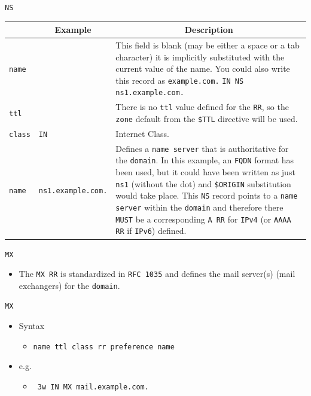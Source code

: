 \documentclass[xcolor=table]{beamer}
\begin{document}
\begin{frame}{\texttt{NS}}
  \begin{table}
    \tiny
    \begin{tabular}{|p{1.6cm}|p{1.6cm}|p{4.7cm}|} 
      \hline
      \rowcolor{gray}
      \multicolumn{1}{|c|}{Syntax} & \multicolumn{1}{c|}{Example} & \multicolumn{1}{c|}{Description}\\ 
      \hline
      \texttt{name}&&This field is blank (may be either a space or a tab character) it is implicitly substituted with the current value of the name. You could also write this record as \texttt{example.com.} \texttt{IN NS ns1.example.com.}\\
      \hline
      \texttt{ttl}&&There is no \texttt{ttl} value defined for the \texttt{RR}, so the \texttt{zone} default from the \texttt{\$TTL} directive will be used.\\
      \hline
      \texttt{class}&\texttt{IN}&Internet Class.\\
      \hline
      \texttt{name}&\texttt{ns1.example.com.}&Defines a \texttt{name server} that is authoritative for the \texttt{domain}. In this example, an \texttt{FQDN} format has been used, but it could have been
      written as just \texttt{ns1} (without the dot) and \texttt{\$ORIGIN} substitution would take place. This \texttt{NS} record points to a \texttt{name server} within the \texttt{domain} and therefore there \texttt{MUST} be a corresponding \texttt{A RR} for \texttt{IPv4} (or \texttt{AAAA RR}
      if \texttt{IPv6}) defined.\\
      \hline
    \end{tabular}
  \end{table}
\end{frame}

\begin{frame}{\texttt{MX}}
  \begin{itemize}
      \item The \texttt{MX RR} is standardized in \texttt{RFC 1035} and defines the mail server(s) (mail exchangers) for the \texttt{domain}.
  \end{itemize}
\end{frame}

\begin{frame}{\texttt{MX}}
  \begin{itemize}
    \item Syntax
      \begin{itemize}
        \item \texttt{name ttl class rr preference name}
      \end{itemize}
    \item e.g.
      \begin{itemize}
        \item \texttt{ 3w IN MX mail.example.com.}
      \end{itemize}
  \end{itemize}
\end{frame}
\end{document}
